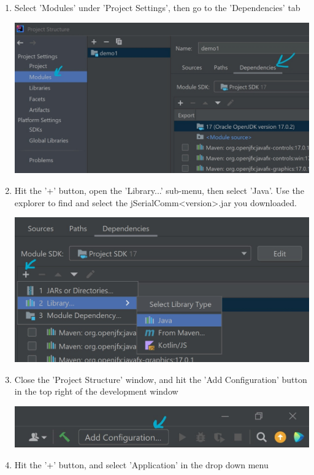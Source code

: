 \documentclass{article}
\begin{document}
\begin{enumerate}
\begin{center}
    \end{center}
\newpage
  \item Select 'Modules' under 'Project Settings', then go to the 'Dependencies' tab
    \begin{center}
    \includegraphics{DevGuideModulesDependencies}
    \end{center}
  \item Hit the '+' button, open the 'Library...' sub-menu, then select 'Java'. Use the explorer to find and select the jSerialComm<version>.jar you downloaded.
    \begin{center}
    \includegraphics{DevGuideLibrary}
    \end{center}
  \item Close the 'Project Structure' window, and hit the 'Add Configuration' button in the top right of the development window
    \begin{center}
    \includegraphics{DevGuideAddConfig}
    \end{center}
  \item Hit the '+' button, and select 'Application' in the drop down menu

\end{enumerate}
\end{document}
